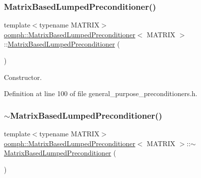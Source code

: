 \subsubsection{\texorpdfstring{Matrix\+Based\+Lumped\+Preconditioner()}{MatrixBasedLumpedPreconditioner()}\hspace{0.1cm}{\footnotesize\ttfamily [1/2]}}
{\footnotesize\ttfamily template$<$typename M\+A\+T\+R\+IX$>$ \\
\hyperlink{classoomph_1_1MatrixBasedLumpedPreconditioner}{oomph\+::\+Matrix\+Based\+Lumped\+Preconditioner}$<$ M\+A\+T\+R\+IX $>$\+::\hyperlink{classoomph_1_1MatrixBasedLumpedPreconditioner}{Matrix\+Based\+Lumped\+Preconditioner} (\begin{DoxyParamCaption}{ }\end{DoxyParamCaption})\hspace{0.3cm}{\ttfamily [inline]}}



Constructor. 



Definition at line 100 of file general\+\_\+purpose\+\_\+preconditioners.\+h.

\mbox{\label{classoomph_1_1MatrixBasedLumpedPreconditioner_a1db36c78089a01b009fa5f26cf84d8a4}} 
\subsubsection{\texorpdfstring{$\sim$\+Matrix\+Based\+Lumped\+Preconditioner()}{~MatrixBasedLumpedPreconditioner()}}
{\footnotesize\ttfamily template$<$typename M\+A\+T\+R\+IX$>$ \\
\hyperlink{classoomph_1_1MatrixBasedLumpedPreconditioner}{oomph\+::\+Matrix\+Based\+Lumped\+Preconditioner}$<$ M\+A\+T\+R\+IX $>$\+::$\sim$\hyperlink{classoomph_1_1MatrixBasedLumpedPreconditioner}{Matrix\+Based\+Lumped\+Preconditioner} (\begin{DoxyParamCaption}{ }\end{DoxyParamCaption})\hspace{0.3cm}{\ttfamily [inline]}}



